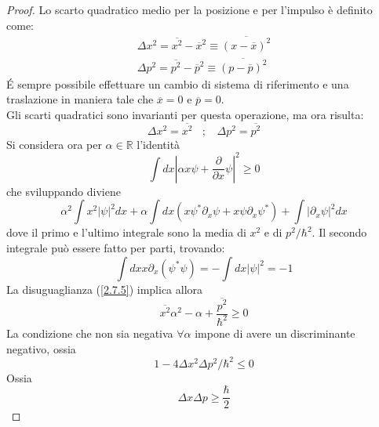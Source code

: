 \documentclass[twoside]{article}
\begin{document}
\begin{proof}
Lo scarto quadratico medio per la posizione e per l'impulso è definito come:
\begin{equation}
    \begin{split}
        \Delta x^2=\overline{x^2}-\overline{x}^2\equiv \overline{(x-\overline{x})^2} \\
        \Delta p^2=\overline{p^2}-\overline{p}^2\equiv \overline{(p-\overline{p})^2}
    \end{split}
\end{equation}
\'E sempre possibile effettuare un cambio di sistema di riferimento e una traslazione in maniera tale che $\overline{x}=0$ e $\overline{p}=0$.
\\
Gli scarti quadratici sono invarianti per questa operazione, ma ora risulta:
\begin{equation}
    \Delta x^2=\overline{x^2} \ \ \ \ ; \ \ \ \ \Delta p^2=\overline{p^2}
\end{equation}
Si considera ora per $\alpha \in \mathds{R}$ l'identità
\begin{equation}\label{2.7.5}
    \int dx \left| \alpha x \psi + \frac{\partial}{\partial x}\psi \right|^2 \ge 0
\end{equation}
che sviluppando diviene
\begin{equation}
    \alpha^2\int x^2 |\psi|^2 dx + \alpha \int dx (x\psi^* \partial_x \psi + x\psi \partial_x \psi^*)+\int |\partial_x \psi|^2 dx
\end{equation}
dove il primo e l'ultimo integrale sono la media di $x^2$ e di $p^2/\hbar^2$. Il secondo integrale può essere fatto per parti, trovando:
\begin{equation}
    \int dx x \partial_x (\psi^* \psi)=-\int dx |\psi|^2 =-1
\end{equation}
La disuguaglianza (\ref{2.7.5}) implica allora
\begin{equation}
    \overline{x^2}\alpha^2 - \alpha +\frac{\overline{p^2}}{\hbar^2}\ge 0
\end{equation}
La condizione che non sia negativa $\forall \alpha$ impone di avere un discriminante negativo, ossia
\begin{equation}
    1-4\Delta x^2 \Delta p^2 /\hbar^2 \le 0
\end{equation}
Ossia
\begin{equation}
    \Delta x \Delta p \ge \frac{\hbar}{2}
\end{equation}
\end{proof}
\end{document}
